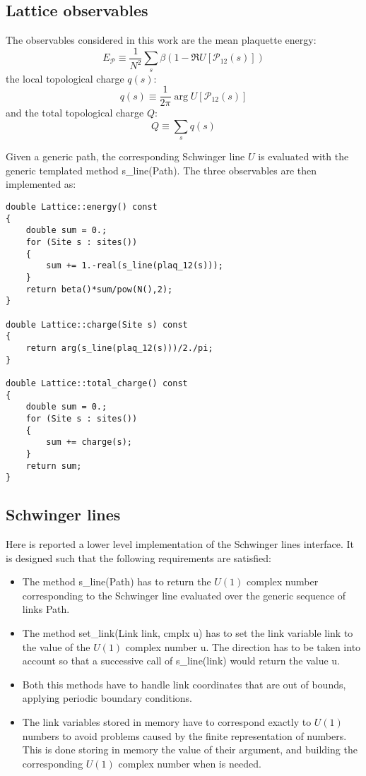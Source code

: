 \subsection*{Lattice observables}

The observables considered in this work are the mean plaquette energy:
\[
    E_{\mathcal P} \equiv \frac{1}{N^2}\sum_s \beta\left(1-\Re U[\mathcal P_{12}(s)]\right)
\]
the local topological charge $q(s)$:
\[
    q(s) \equiv \frac{1}{2\pi}\arg U[\mathcal P_{12}(s)]
\]
and the total topological charge $Q$:
\[
    Q \equiv \sum_s q(s)
\]

Given a generic path, the corresponding Schwinger line $U$ is evaluated with the generic templated method {\ttfamily s\_line(Path)}.
The three observables are then implemented as:
\begin{lstlisting}[caption={Lattice observables}]
double Lattice::energy() const
{
    double sum = 0.;
    for (Site s : sites())
    {
        sum += 1.-real(s_line(plaq_12(s)));
    }
    return beta()*sum/pow(N(),2);
}

double Lattice::charge(Site s) const
{
    return arg(s_line(plaq_12(s)))/2./pi;
}

double Lattice::total_charge() const
{
    double sum = 0.;
    for (Site s : sites())
    {
        sum += charge(s);
    }
    return sum;
}
\end{lstlisting}

\subsection*{Schwinger lines}

Here is reported a lower level implementation of the Schwinger lines interface.
It is designed such that the following requirements are satisfied:
\begin{itemize}
    \item The method {\ttfamily s\_line(Path)} has to return the $U(1)$ complex number corresponding to the Schwinger line evaluated over the generic sequence of links {\ttfamily Path}.
    \item The method {\ttfamily set\_link(Link link, cmplx u)} has to set the link variable {\ttfamily link} to the value of the $U(1)$ complex number {\ttfamily u}.
        The direction has to be taken into account so that a successive call of {\ttfamily s\_line(link)} would return the value {\ttfamily u}.
    \item Both this methods have to handle link coordinates that are out of bounds, applying periodic boundary conditions.
    \item The link variables stored in memory have to correspond exactly to $U(1)$ numbers to avoid problems caused by the finite representation of numbers.
        This is done storing in memory the value of their argument, and building the corresponding $U(1)$ complex number when is needed.
\end{itemize}

